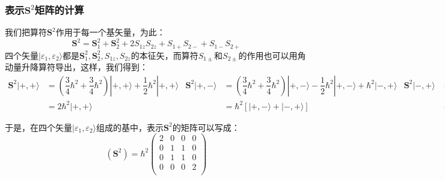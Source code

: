 \documentclass[]{article}
\begin{document}
\subsubsection{表示$\boldsymbol{S}^2$矩阵的计算}
我们把算符$\boldsymbol{S}^2$作用于每一个基矢量，为此：
\begin{equation}
	\boldsymbol{S}^2=\boldsymbol{S}_1^2+\boldsymbol{S}_2^2+2S_{1z}S_{2z}+S_{1+}S_{2-}+S_{1-}S_{2+}
\end{equation}
四个矢量$|\varepsilon_1,\varepsilon_2\rangle$都是$\boldsymbol{S}_1^2,\boldsymbol{S}_2^2,S_{1z},S_{2z}$的本征矢，而算符$S_{1\pm}$和$S_{2\pm}$的作用也可以用角动量升降算符导出，这样，我们得到：
\begin{subequations}
	\begin{align}
		\boldsymbol{S}^2|+,+\rangle&=\left( \dfrac{3}{4}\hbar^2+\dfrac{3}{4}\hbar^2\right) |+,+\rangle+\dfrac{1}{2}\hbar^2|+,+\rangle\nonumber\\
		&=2\hbar^2|+,+\rangle
	\end{align}
	\begin{align}
		\boldsymbol{S}^2|+,-\rangle&=\left( \dfrac{3}{4}\hbar^2+\dfrac{3}{4}\hbar^2\right) |+,-\rangle-\dfrac{1}{2}\hbar^2|+,-\rangle+\hbar^2|-,+\rangle\nonumber\\
		&=\hbar^2[|+,-\rangle+|-,+\rangle]
	\end{align}	
		\begin{align}
		\boldsymbol{S}^2|-,+\rangle&=\left( \dfrac{3}{4}\hbar^2+\dfrac{3}{4}\hbar^2\right) |-,+\rangle-\dfrac{1}{2}\hbar^2|-,+\rangle+\hbar^2|+,-\rangle\nonumber\\
		&=\hbar^2[|-,+\rangle+|+,-\rangle]
	\end{align}	
	\begin{align}
		\boldsymbol{S}^2|-,-\rangle&=\left( \dfrac{3}{4}\hbar^2+\dfrac{3}{4}\hbar^2\right) |-,-\rangle+\dfrac{1}{2}\hbar^2|-,-\rangle\nonumber\\
		&=2\hbar^2|-,-\rangle
	\end{align}
\end{subequations}

于是，在四个矢量$|\varepsilon_1,\varepsilon_2\rangle$组成的基中，表示$\boldsymbol{S}^2$的矩阵可以写成：
\begin{equation}
	(\boldsymbol{S}^2)=\hbar^2\begin{pmatrix}
		2&0&0&0\\
		0&1&1&0\\
		0&1&1&0\\
		0&0&0&2\\
	\end{pmatrix}
	\label{b18b18}
\end{equation}
\end{document}
